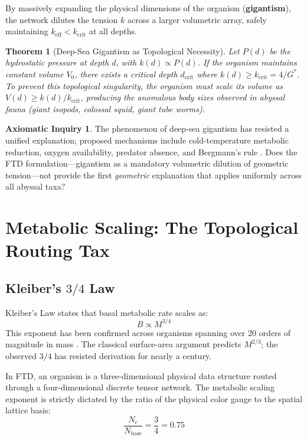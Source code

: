 \documentclass[11pt, letterpaper]{article}
\newcommand{\G}{G^*}
\newtheorem{theorem}{Theorem}[section]
\theoremstyle{definition}
\newtheorem{inquiry}{Axiomatic Inquiry}[section]
\theoremstyle{remark}
\begin{document}
By massively expanding the physical dimensions of the organism (\textbf{gigantism}), the network dilutes the tension $k$ across a larger volumetric array, safely maintaining $k_{\text{eff}} < k_{\text{crit}}$ at all depths.

\begin{theorem}[Deep-Sea Gigantism as Topological Necessity]
Let $P(d)$ be the hydrostatic pressure at depth $d$, with $k(d) \propto P(d)$. If the organism maintains constant volume $V_0$, there exists a critical depth $d_{\text{crit}}$ where $k(d) \geq k_{\text{crit}} = 4/\G$. To prevent this topological singularity, the organism must scale its volume as $V(d) \geq k(d) / k_{\text{crit}}$, producing the anomalous body sizes observed in abyssal fauna (giant isopods, colossal squid, giant tube worms).
\end{theorem}

\begin{inquiry}
The phenomenon of deep-sea gigantism has resisted a unified explanation; proposed mechanisms include cold-temperature metabolic reduction, oxygen availability, predator absence, and Bergmann's rule \cite{Timofeev2001}. Does the FTD formulation---gigantism as a mandatory volumetric dilution of geometric tension---not provide the first \textit{geometric} explanation that applies uniformly across all abyssal taxa?
\end{inquiry}

\section{Metabolic Scaling: The Topological Routing Tax}

\subsection{Kleiber's $3/4$ Law}

Kleiber's Law \cite{Kleiber1932} states that basal metabolic rate scales as:
\begin{equation}
    B \propto M^{3/4}
\end{equation}
This exponent has been confirmed across organisms spanning over 20 orders of magnitude in mass \cite{West1997}. The classical surface-area argument predicts $M^{2/3}$; the observed $3/4$ has resisted derivation for nearly a century.

In FTD, an organism is a three-dimensional physical data structure routed through a four-dimensional discrete tensor network. The metabolic scaling exponent is strictly dictated by the ratio of the physical color gauge to the spatial lattice basis:
\begin{equation}
    \frac{N_c}{N_{\text{base}}} = \frac{3}{4} = 0.75
\end{equation}
\end{document}
